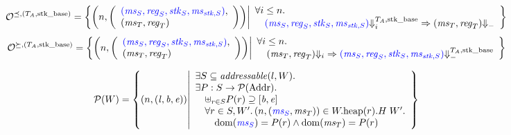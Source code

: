 \documentclass[a4paper]{article}
\begin{document}
\[
  \lrol = \left\{ \npair{\left(\array{l}\src{(\ms_S,\reg_S,\stk_S,\ms_{\stk,S})},\\(\ms_T,\reg_T)\endarray\right)} \middle|
    \begin{array}{l}
      \forall i \leq n \ldotp \\
      \quad \src{(\ms_S,\reg_S,\stk_S,\ms_{\stk,S})} \sterm[i]{\ta,\stkb} \Rightarrow (\ms_T,\reg_T) \term\\
    \end{array}
\right\}
\]
\[
  \lror = \left\{ \npair{\left(\array{l}\src{(\ms_S,\reg_S,\stk_S,\ms_{\stk,S})},\\(\ms_T,\reg_T)\endarray\right)} \middle|
    \begin{array}{l}
      \forall i \leq n \ldotp \\ 
      \quad (\ms_T ,\reg_T) \term[i] \Rightarrow \src{(\ms_S,\reg_S,\stk_S,\ms_{\stk,S})} \sterm{\ta,\stkb}
    \end{array}
\right\}
\]


\[
  \lrp(W) = \left\{ \npair{(\lin,\baddr,\eaddr)} \middle|
    \begin{array}{l}
      \exists S \subseteq \addressable{l,W} \ldotp\\
      \exists P : S \rightarrow \powerset{\Addr} \ldotp\\
      \quad \uplus_{r \in S} P(r) \supseteq [\baddr,\eaddr] \\
      \quad \forall r \in S, W'\ldotp \npair{\stpair{\ms}{\ms}} \in \pwheap(r).H \; W'  \ldotp \\
      \qquad \dom(\src{\ms_S}) = P(r) \wedge \dom(\ms_T) = P(r)
    \end{array}
  \right\}
\]
\end{document}
